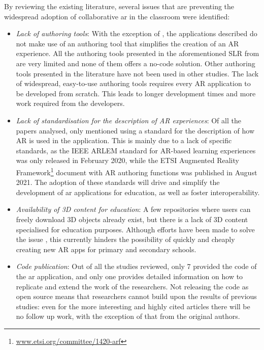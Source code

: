 By reviewing the existing literature, several issues that are preventing the widespread adoption of collaborative \gls{ar} in the classroom were identified:
\begin{itemize}
    \item \textit{Lack of authoring tools}: With the exception of \cite{lytridis2018artutor, whitlock2020mrcat, farella2021augmented, farella2022arete}, the applications described do not make use of an authoring tool that simplifies the creation of an AR experience. All the authoring tools presented in the aforementioned SLR from \cite{dengel2022review} are very limited and none of them offers a no-code solution. Other authoring tools presented in the literature \citep{rajaram2022paper, blattgerste2023trainar} have not been used in other studies. The lack of widespread, easy-to-use authoring tools requires every AR application to be developed from scratch. This leads to longer development times and more work required from the developers.
    \item \textit{Lack of standardisation for the description of AR experiences}: Of all the papers analysed, only \cite{farella2022arete} mentioned using a standard for the description of how AR is used in the application. This is mainly due to a lack of specific standards, as the IEEE ARLEM standard \citep{arlem2020} for AR-based learning experiences was only released in February 2020, while the ETSI Augmented Reality Framework\footnote{\url{www.etsi.org/committee/1420-arf}} document with AR authoring functions was published in August 2021. The adoption of these standards will drive and simplify the development of \gls{ar} applications for education, as well as foster interoperability.
    \item \textit{Availability of 3D content for education}: A few repositories where users can freely download 3D objects already exist, but there is a lack of 3D content specialised for education purposes. Although efforts have been made to solve the issue \citep{masneri2020work, deitke2023objaversexl}, this currently hinders the possibility of quickly and cheaply creating new AR apps for primary and secondary schools.
    \item \textit{Code publication}: Out of all the studies reviewed, only 7 provided the code of the \gls{ar} application, and only one \citep{wellmann2022open} provides detailed information on how to replicate and extend the work of the researchers. Not releasing the code as open source means that researchers cannot build upon the results of previous studies: even for the more interesting and highly cited articles there will be no follow up work, with the exception of that from the original authors.
\end{itemize}

